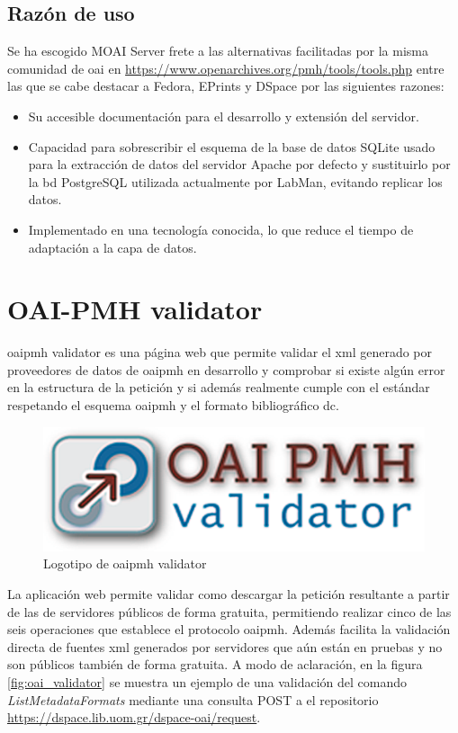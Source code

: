 \subsection{Razón de uso}

Se ha escogido MOAI Server frete a las alternativas facilitadas por la misma comunidad de \acrshort{oai} en \url{https://www.openarchives.org/pmh/tools/tools.php} entre las que se cabe destacar a Fedora, EPrints y DSpace por las siguientes razones:

\begin{itemize}
	\item Su accesible documentación para el desarrollo y extensión del servidor.
	\item Capacidad para sobrescribir el esquema de la base de datos SQLite usado para la extracción de datos del servidor Apache por defecto y sustituirlo por la \acrshort{bd} PostgreSQL utilizada actualmente por LabMan, evitando replicar los datos.
	\item Implementado en una tecnología conocida, lo que reduce el tiempo de adaptación a la capa de datos.
\end{itemize}

\section{OAI-PMH validator}

\acrshort{oaipmh} validator\cite{oaipmh_validator} es una página web que permite validar el \acrshort{xml} generado por proveedores de datos de \acrshort{oaipmh} en desarrollo y comprobar si existe algún error en la estructura de la petición y si además realmente cumple con el estándar respetando el esquema \acrshort{oaipmh} y el formato bibliográfico \acrshort{dc}.


\begin{figure}[!htbp]
	\centering
	\includegraphics[scale=0.5]{fig/oaipmh_validator_logo}
	\caption{Logotipo de \acrshort{oaipmh} validator}
\end{figure}

La aplicación web permite validar como descargar la petición resultante a partir de las  de servidores públicos de forma gratuita, permitiendo realizar cinco de las seis operaciones que establece el protocolo \acrshort{oaipmh}. Además facilita la validación directa de fuentes \acrshort{xml} generados por servidores que aún están en pruebas y no son públicos también de forma gratuita. A modo de aclaración, en la figura \ref{fig:oai_validator} se muestra un ejemplo de una validación del comando \textit{ListMetadataFormats} mediante una consulta POST a el repositorio \url{https://dspace.lib.uom.gr/dspace-oai/request}.

